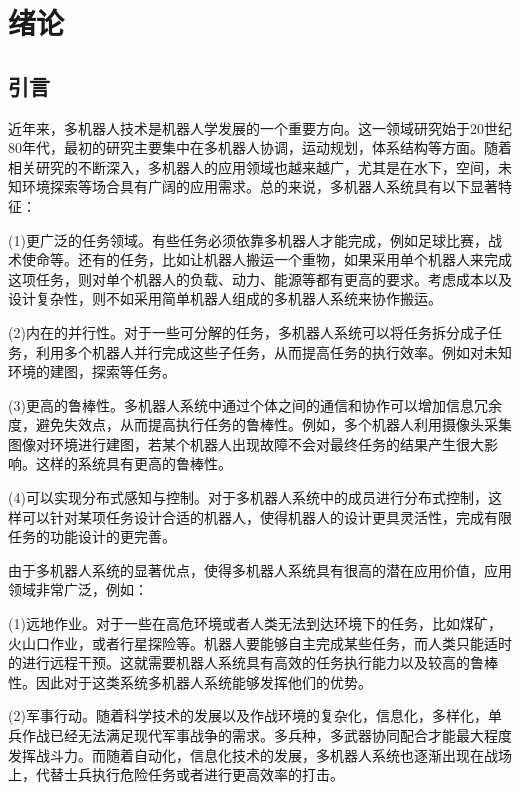 
\chapter{绪论}
\label{chap:intro}

\section{引言}
近年来，多机器人技术是机器人学发展的一个重要方向。这一领域研究始于20世纪80年代，最初的研究主要集中在多机器人协调，运动规划，体系结构等方面。随着相关研究的不断深入，多机器人的应用领域也越来越广，尤其是在水下，空间，未知环境探索等场合具有广阔的应用需求。总的来说，多机器人系统具有以下显著特征\supercite{蔡自兴,谭民2005多机器人系统}：
	
	(1)更广泛的任务领域。有些任务必须依靠多机器人才能完成，例如足球比赛，战术使命等。还有的任务，比如让机器人搬运一个重物，如果采用单个机器人来完成这项任务，则对单个机器人的负载、动力、能源等都有更高的要求。考虑成本以及设计复杂性，则不如采用简单机器人组成的多机器人系统来协作搬运。
	
	(2)内在的并行性。对于一些可分解的任务，多机器人系统可以将任务拆分成子任务，利用多个机器人并行完成这些子任务，从而提高任务的执行效率。例如对未知环境的建图，探索等任务。
	
	(3)更高的鲁棒性。多机器人系统中通过个体之间的通信和协作可以增加信息冗余度，避免失效点，从而提高执行任务的鲁棒性。例如，多个机器人利用摄像头采集图像对环境进行建图，若某个机器人出现故障不会对最终任务的结果产生很大影响。这样的系统具有更高的鲁棒性。
	
	(4)可以实现分布式感知与控制。对于多机器人系统中的成员进行分布式控制，这样可以针对某项任务设计合适的机器人，使得机器人的设计更具灵活性，完成有限任务的功能设计的更完善。
	
由于多机器人系统的显著优点，使得多机器人系统具有很高的潜在应用价值，应用领域非常广泛，例如：

	(1)远地作业。对于一些在高危环境或者人类无法到达环境下的任务，比如煤矿，火山口作业，或者行星探险等。机器人要能够自主完成某些任务，而人类只能适时的进行远程干预。这就需要机器人系统具有高效的任务执行能力以及较高的鲁棒性。因此对于这类系统多机器人系统能够发挥他们的优势。
	
	(2)军事行动。随着科学技术的发展以及作战环境的复杂化，信息化，多样化，单兵作战已经无法满足现代军事战争的需求。多兵种，多武器协同配合才能最大程度发挥战斗力。而随着自动化，信息化技术的发展，多机器人系统也逐渐出现在战场上，代替士兵执行危险任务或者进行更高效率的打击。
	
